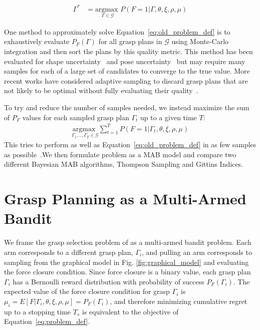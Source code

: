 \documentclass[a4paper, 10pt, conference]{ieeeconf}      %
\newcommand{\mG}{\mathcal{G}}
\begin{document}
\vspace{-2ex}
\begin{align}
\Gamma^* &= \underset{\Gamma \in \mG}{\text{argmax }} P\left( F = 1 | \Gamma, \theta, \xi, \rho, \mu \right) \label{eq:old_problem_def}
\end{align}



One method to approximately solve Equation~\ref{eq:old_problem_def} is to exhaustively evaluate $P_F(\Gamma)$ for all grasp plans in $\mG$ using Monte-Carlo integration and then sort the plans by this quality metric.
This method has been evaluated for shape uncertainty~\cite{christopoulos2007handling, kehoe2012estimating} and pose uncertainty~\cite{weisz2012pose} but may require many samples for each of a large set of candidates to converge to the true value.
More recent works have considered adaptive sampling to discard grasp plans that are not likely to be optimal without fully evaluating their quality~\cite{kehoe2012toward}.

To try and reduce the number of samples needed, we instead maximize the sum of $P_F$ values for each sampled grasp plan $\Gamma_t$ up to a given time $T$:
\begin{align}
    \underset{\Gamma_1, .., \Gamma_T \in \mG}{\text{argmax }} \sum \limits_{t=1}^T P\left( F = 1 | \Gamma_t, \theta, \xi, \rho, \mu \right)   \label{eq:problem_def}
\end{align}
\noindent This tries to perform as well as Equation~\ref{eq:old_problem_def} in as few samples as possible~\cite{srinivas2009gaussian}.We then formulate  problem as a MAB model and compare two different Bayesian MAB algorithms, Thompson Sampling and Gittins Indices.

\section{Grasp Planning as a Multi-Armed Bandit}
We frame the grasp selection problem of  as a multi-armed bandit problem.
Each arm corresponds to a different grasp plan, $\Gamma_i$, and pulling an arm corresponds to sampling from the graphical model in Fig. \ref{fig:graphical_model} and evaluating the force closure condition.
Since force closure is a binary value, each grasp plan $\Gamma_i$ has a Bernoulli reward distribution with probability of success $P_F(\Gamma_i)$.
The expected value of the force closure condition for grasp $\Gamma_i$ is $\mu_i = E \left[ F | \Gamma_i, \theta, \xi, \rho, \mu \right] = P_F(\Gamma_i)$, and therefore minimizing cumulative regret up to a stopping time $T_s$ is equivalent to the objective of Equation~\ref{eq:problem_def}.
\end{document}

